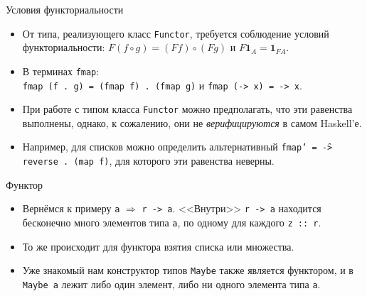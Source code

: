 \documentclass[xcolor=dvipsnames]{beamer}
\newcommand{\One}{\mathbf{1}}
\begin{document}
\begin{frame}{Условия функториальности}
 \begin{itemize}[<+->]
 \item От типа, реализующего класс \texttt{Functor}, требуется соблюдение условий функториальности: $F(f \circ g) = (F f) \circ (F g)$ и $F \One_A = \One_{FA}$.
 \item В терминах \texttt{fmap}:\\
 \texttt{fmap (f . g) = (fmap f) . (fmap g)} и \texttt{fmap (\x -> x) = \x -> x}.
 \item При работе с типом класса \texttt{Functor} можно предполагать, что эти равенства выполнены, однако, к сожалению, они не {\em верифицируются} в самом Haskell'е.
 \item Например, для списков можно определить альтернативный \texttt{fmap' = \f -> reverse .                                                                                                                                                                                                                                                                                                                                                                                                                                                                                                                   (map f)}, для которого эти равенства неверны.
\end{itemize}

\end{frame}

\begin{frame}{Функтор}
 
 \begin{itemize}[<+->]
  \item Вернёмся к примеру \texttt{a} $\Rightarrow$ \texttt{r -> a}. <<Внутри>> \texttt{r -> a} находится бесконечно много элементов типа \texttt{a}, по одному для каждого \texttt{z :: r}.
  \item То же происходит для функтора взятия списка или множества.
  \item Уже знакомый нам конструктор типов \texttt{Maybe} также является функтором, и в \texttt{Maybe a} лежит либо один элемент, либо ни одного элемента типа \texttt{a}.
 \end{itemize}

\end{frame}
\fi
\end{document}
